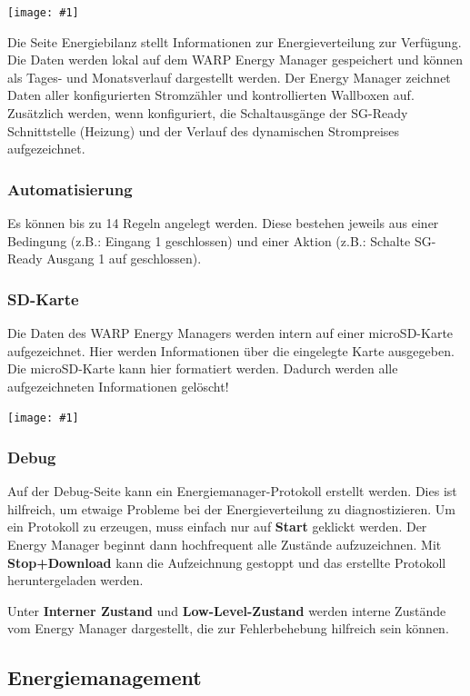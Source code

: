 \documentclass[a4paper,10pt]{article}
\newcommand{\gfx}[1]{\texttt{[image: \#1]}}
\begin{document}
\begin{multicols*}{2}
	\gfx{./img/resized/web_em_energy_analysis}
	\vspace{-0.2cm}

	Die Seite Energiebilanz stellt Informationen zur Energieverteilung zur Verfügung.
	Die Daten werden lokal auf dem WARP Energy Manager gespeichert und
	können als Tages- und Monatsverlauf dargestellt werden.
	Der Energy Manager zeichnet Daten aller konfigurierten Stromzähler und kontrollierten Wallboxen auf. Zusätzlich werden, wenn konfiguriert,
    die Schaltausgänge der SG-Ready Schnittstelle (Heizung) und der Verlauf des dynamischen Strompreises aufgezeichnet.

    \subsubsection{Automatisierung}
    Es können bis zu 14 Regeln angelegt werden. Diese bestehen jeweils aus einer Bedingung (z.B.: \glqq Eingang 1 geschlossen\grqq) 
    und einer Aktion (z.B.: \glqq Schalte SG-Ready Ausgang 1 auf geschlossen\grqq).
    
    
    \subsubsection{SD-Karte}
    Die Daten des WARP Energy Managers werden intern auf einer microSD-Karte
	aufgezeichnet. Hier werden Informationen über die eingelegte Karte ausgegeben. Die microSD-Karte kann
	hier formatiert werden. Dadurch werden alle aufgezeichneten Informationen gelöscht!

	\gfx{./img/resized/web_em_sdcard}
    
	\subsubsection{Debug}
	Auf der Debug-Seite kann ein Energiemanager-Protokoll erstellt werden. Dies
	ist hilfreich, um etwaige Probleme bei der Energieverteilung zu diagnostizieren. Um
	ein Protokoll zu erzeugen, muss einfach nur auf \textbf{Start} geklickt
	werden. Der Energy Manager beginnt dann hochfrequent alle Zustände
	aufzuzeichnen. Mit \textbf{Stop+Download} kann die Aufzeichnung gestoppt und
	das erstellte Protokoll heruntergeladen werden.

	Unter \textbf{Interner Zustand} und \textbf{Low-Level-Zustand} werden interne Zustände vom Energy Manager
	dargestellt, die zur Fehlerbehebung hilfreich sein können.

	\subsection{Energiemanagement}

\end{multicols*}
\end{document}
